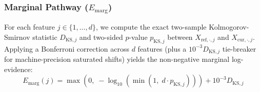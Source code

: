 \documentclass[10pt,conference]{IEEEtran}
\begin{document}
\subsubsection{Marginal Pathway (\texorpdfstring{$E_{\mathrm{marg}}$}{E\_marg})}
For each feature $j \in \{1, \dots, d\}$, we compute the exact two-sample
Kolmogorov-Smirnov statistic $D_{\mathrm{KS}, j}$ and two-sided $p$-value
$p_{\mathrm{KS}, j}$ between $X_{\mathrm{ref}, \cdot, j}$ and
$X_{\mathrm{cur}, \cdot, j}$. Applying a Bonferroni correction across $d$
features (plus a $10^{-3} D_{\mathrm{KS}, j}$ tie-breaker for machine-precision
saturated shifts) yields the non-negative marginal log-evidence:
\begin{equation}
  E_{\mathrm{marg}}(j) = \max\left(0,\; -\log_{10}\left(
    \min\left(1,\; d \cdot p_{\mathrm{KS}, j}\right)
  \right)\right) + 10^{-3} D_{\mathrm{KS}, j}
  \label{eq:e_marg}
\end{equation}
\end{document}
